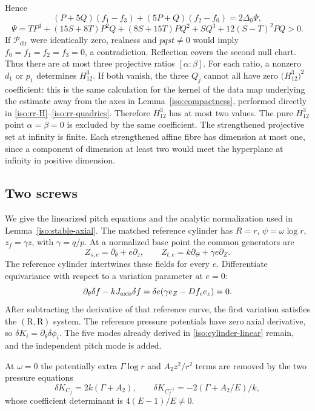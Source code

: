 \documentclass[11pt,a4paper]{article}
\numberwithin{equation}{section}
\theoremstyle{plain}
\theoremstyle{definition}
\theoremstyle{remark}
\begin{document}
Hence
\[
 (P+5Q)(f_1-f_3)+(5P+Q)(f_2-f_0)=2\Delta_0\Psi,
\]
\[
 \Psi=TP^3+(15S+8T)P^2Q+(8S+15T)PQ^2+SQ^3
                                      +12(S-T)^2PQ>0.
\]
If $\mathcal P_{\mathrm{dir}}$ were identically zero, realness and $pqst\ne0$ would imply
$f_0=f_1=f_2=f_3=0$, a contradiction.  Reflection covers the second null
chart.  Thus there are at most three projective ratios $[\alpha:\beta]$.
For each ratio, a nonzero $d_1$ or $p_1$ determines $H_{12}^3$.  If both vanish,
the three $Q_j$ cannot all have zero $\bigl(H_{12}^3\bigr)^2$ coefficient: this is the
same calculation for the kernel of the data map underlying the estimate away from the axes in
Lemma~\ref{iso:compactness}, performed directly in
\eqref{iso:rr-H}--\eqref{iso:rr-quadrics}.  Therefore $H_{12}^3$ has at most
two values.  The pure $H_{12}^3$ point $\alpha=\beta=0$ is excluded by the
same coefficient.  The strengthened projective set at infinity is finite.  Each strengthened affine fibre has dimension at
most one, since a component of dimension at least two would meet the
hyperplane at infinity in positive dimension.

\subsection{Two screws}\label{appiso-ss}
We give the linearized pitch equations and the analytic normalization
used in Lemma~\ref{iso:stable-axial}. The matched reference cylinder has
$R=r$, $\psi=\omega\log r$, $z_f=\gamma z$, with $\gamma=q/p$.
At a normalized base point the common generators are
\[
 Z_{s,e}=\partial_\theta+e\partial_z,\qquad
 Z_{t,e}=k\partial_\Theta+\gamma e\partial_Z .
\]
The reference cylinder intertwines these fields for every $e$.
Differentiate equivariance with respect to a variation parameter at $e=0$:
\[
 \partial_\theta\delta f-kJ_{\rm axis}\delta f
       =\delta e(\gamma e_Z-Df_c e_z)=0.
\]
After subtracting the derivative of that reference curve,
the first variation satisfies the $(\mathrm{R},\mathrm{R})$ system.
The reference pressure potentials have zero axial derivative, so
$\delta K_i=\partial_\theta\delta\phi_i$.
The five modes already derived in \eqref{iso:cylinder-linear} remain,
and the independent pitch mode is added.

At $\omega=0$ the potentially extra $\Gamma\log r$ and $A_2z^2/r^2$
terms are removed by the two pressure equations
\[
 \delta K_{C_f}=2k(\Gamma+A_2),\qquad
 \delta K_{C_f^{-1}}=-2(\Gamma+A_2/E)/k,
\]
whose coefficient determinant is $4(E-1)/E\ne0$.
\end{document}
